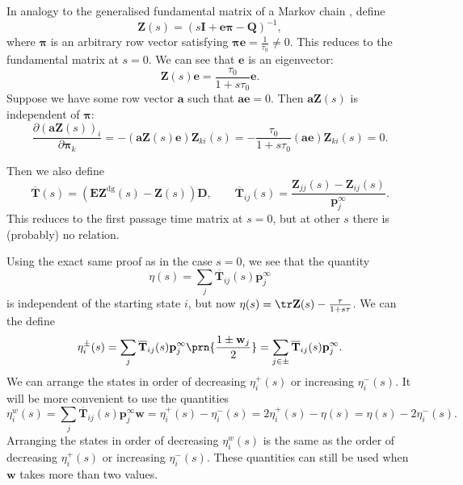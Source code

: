 \documentclass[12pt]{article}
\newcommand{\inv}{^{-1}}
\newcommand{\dg}{^\mathrm{dg}}
\newcommand{\I}{\mathbf{I}}
\newcommand{\onev}{\mathbf{e}}
\newcommand{\onem}{\mathbf{E}}
\newcommand{\MM}{\mathbf{Q}}
\newcommand{\pr}{\mathbf{p}}
\newcommand{\eq}{\pr^\infty}
\newcommand{\fpt}{\mathbf{T}}
\newcommand{\fptb}{\overline{\fpt}}
\newcommand{\fund}{\mathbf{Z}}
\newcommand{\D}{\mathbf{D}}
\newcommand{\pib}{\boldsymbol{\pi}}
\newcommand{\w}{\mathbf{w}}
\renewcommand{\pdiff}[2]{\frac{\partial #1}{\partial #2}}
\begin{document}
In analogy to the generalised fundamental matrix of a Markov chain \cite{Kemeny1981fund}, define
%
\begin{equation}\label{eq:lfund}
  \fund(s) = (s\I +\onev\pib -\MM)\inv,
\end{equation}
%
where $\pib$ is an arbitrary row vector satisfying $\pib\onev = \frac{1}{\tau_0} \neq 0$.
This reduces to the fundamental matrix at $s=0$.
We can see that $\onev$ is an eigenvector:
%
\begin{equation}\label{eq:lfundrowsum}
  \fund(s)\onev = \frac{\tau_0}{1+s\tau_0}\onev.
\end{equation}
%
Suppose we have some row vector $\mathbf{a}$ such that $\mathbf{a}\onev=0$.
Then $\mathbf{a}\fund(s)$ is independent of $\pib$:
%
\begin{equation}\label{eq:alfund}
  \pdiff{(\mathbf{a}\fund(s))_i}{\pib_k} = -(\mathbf{a}\fund(s)\onev) \fund_{ki}(s)
      = -\frac{\tau_0}{1+s\tau_0} (\mathbf{a}\onev) \fund_{ki}(s) = 0.
\end{equation}
%


Then we also define
%
\begin{equation}\label{eq:lfptb}
  \fptb(s) = (\onem\fund\dg(s)-\fund(s))\D,
  \qquad
  \fptb_{ij}(s) = \frac{\fund_{jj}(s)-\fund_{ij}(s)}{\eq_j}.
\end{equation}
%
This reduces to the first passage time matrix at $s=0$, but at other $s$ there is (probably) no relation.

Using the exact same proof as in the case $s=0$, we see that the quantity
%
\begin{equation}\label{eq:lkemeny}
  \eta(s) = \sum_j \fptb_{ij}(s)\eq_j
\end{equation}
%
is independent of the starting state $i$, but now $\eta(s) = \tr\fund(s) - \frac{\tau}{1+s\tau}$.
We can the define
%
\begin{equation}\label{eq:lpmixtime}
  \eta^{\pm}_i(s) = \sum_j \fptb_{ij}(s)\eq_j \prn{\frac{1\pm\w_j}{2}} =  \sum_{j\in\pm} \fptb_{ij}(s)\eq_j.
\end{equation}
%
We can arrange the states in order of decreasing $\eta^{+}_i(s)$ or increasing $\eta^{-}_i(s)$.
It will be more convenient to use the quantities
%
\begin{equation}\label{eq:lwpmixtime}
  \eta^w_i(s) = \sum_j \fptb_{ij}(s)\eq_j \w
    = \eta^+_i(s) - \eta^-_i(s) =2\eta^+_i(s) - \eta(s) =\eta(s) - 2\eta^-_i(s) .
\end{equation}
%
Arranging the states in order of decreasing $\eta^w_i(s)$ is the same as the order of decreasing $\eta^{+}_i(s)$ or increasing $\eta^{-}_i(s)$.
These quantities can still be used when $\w$ takes more than two values.
\end{document}
